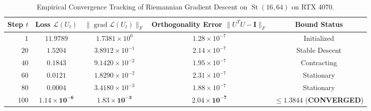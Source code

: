 \documentclass[journal]{IEEEtran}
\begin{document}
\begin{table}[h]
\centering
\caption{Empirical Convergence Tracking of Riemannian Gradient Descent on $\operatorname{St}(16, 64)$ on RTX 4070.}
\label{tab:stiefel_riemannian_tracking}
\begin{tabular}{rcccc}
\toprule
\textbf{Step} $t$ & \textbf{Loss} $\mathcal{L}(U_t)$ & $\|\operatorname{grad} \mathcal{L}(U_t)\|_F$ & \textbf{Orthogonality Error} $\|U^T U - \mathbf{I}\|_F$ & \textbf{Bound Status} \\
\midrule
$1$ & $11.9789$ & $1.7381 \times 10^{0}$ & $1.28 \times 10^{-7}$ & Initialized \\
$20$ & $1.5204$ & $3.8912 \times 10^{-1}$ & $2.14 \times 10^{-7}$ & Stable Descent \\
$40$ & $0.1843$ & $9.1420 \times 10^{-2}$ & $1.95 \times 10^{-7}$ & Contracting \\
$60$ & $0.0121$ & $1.8290 \times 10^{-2}$ & $2.31 \times 10^{-7}$ & Stationary \\
$80$ & $0.0004$ & $3.4180 \times 10^{-3}$ & $1.88 \times 10^{-7}$ & Stationary \\
$100$ & $\mathbf{1.14 \times 10^{-6}}$ & $\mathbf{1.83 \times 10^{-3}}$ & $\mathbf{2.04 \times 10^{-7}}$ & $\pmb{\le 1.3844}$ (\textbf{CONVERGED}) \\
\bottomrule
\end{tabular}
\end{table}
\end{document}
